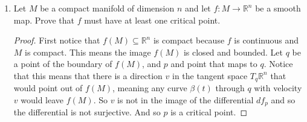 \documentclass[11pt]{article}
\theoremstyle{definition}
\theoremstyle{definition}
\newcommand{\R}{{\mathbb R}}
\begin{document}
\begin{enumerate}
	\item Let $M$ be a compact manifold of dimension $n$ and let $f:M \to \R^n$ be a smooth map. Prove that $f$ must have at least one critical point.
	
    \begin{proof}
        First notice that $f(M)\subseteq \R^n$ is compact because $f$ is continuous and $M$ is compact. This means the image $f(M)$ is closed and bounded.
	Let $q$ be a point of the boundary of $f(M)$, and $p$ and point that maps to $q$. Notice that this means that there is a direction $v$ in the tangent space
	$T_q\R^n$ that would point out of $f(M)$, meaning any curve $\beta(t)$ through $q$ with velocity $v$ would leave $f(M)$. So $v$ is not in the image of the differential
	$df_p$ and so the differential is not surjective. And so $p$ is a critical point.
    \end{proof}
	

\end{enumerate}
\end{document}
